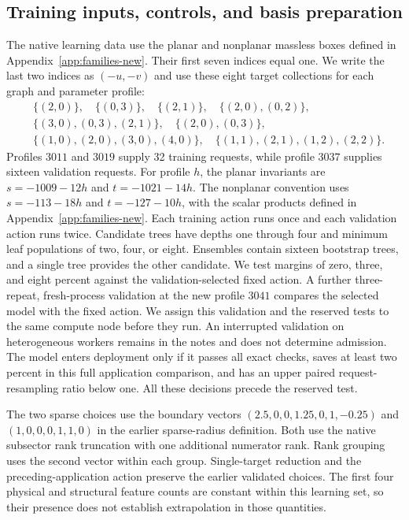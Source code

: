 \subsection{Training inputs, controls, and basis preparation}
The native learning data use the planar and nonplanar massless boxes defined in Appendix~\ref{app:families-new}. Their first seven indices equal one. We write the last two indices as $(-u,-v)$ and use these eight target collections for each graph and parameter profile:
\begin{align*}
 &\{(2,0)\},\quad \{(0,3)\},\quad \{(2,1)\},\quad
 \{(2,0),(0,2)\},\\
 &\{(3,0),(0,3),(2,1)\},\quad \{(2,0),(0,3)\},\\
 &\{(1,0),(2,0),(3,0),(4,0)\},\quad
 \{(1,1),(2,1),(1,2),(2,2)\}.
\end{align*}
Profiles $3011$ and $3019$ supply 32 training requests, while profile $3037$ supplies sixteen validation requests. For profile $h$, the planar invariants are $s=-1009-12h$ and $t=-1021-14h$. The nonplanar convention uses $s=-113-18h$ and $t=-127-10h$, with the scalar products defined in Appendix~\ref{app:families-new}. Each training action runs once and each validation action runs twice. Candidate trees have depths one through four and minimum leaf populations of two, four, or eight. Ensembles contain sixteen bootstrap trees, and a single tree provides the other candidate. We test margins of zero, three, and eight percent against the validation-selected fixed action. A further three-repeat, fresh-process validation at the new profile $3041$ compares the selected model with the fixed action. We assign this validation and the reserved tests to the same compute node before they run. An interrupted validation on heterogeneous workers remains in the notes and does not determine admission. The model enters deployment only if it passes all exact checks, saves at least two percent in this full application comparison, and has an upper paired request-resampling ratio below one. All these decisions precede the reserved test.

The two sparse choices use the boundary vectors
$(2.5,0,0,1.25,0,1,-0.25)$ and $(1,0,0,0,1,1,0)$ in the earlier sparse-radius definition. Both use the native subsector rank truncation with one additional numerator rank. Rank grouping uses the second vector within each group. Single-target reduction and the preceding-application action preserve the earlier validated choices. The first four physical and structural feature counts are constant within this learning set, so their presence does not establish extrapolation in those quantities.

